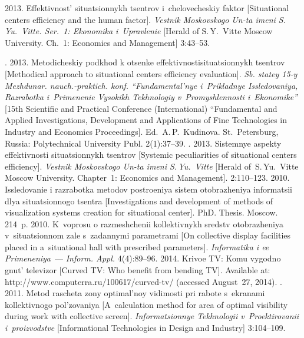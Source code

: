 \begin{multicols}{2}
{{\begin{thebibliography}{99}
 2013. Effektivnost' situatsionnykh tsentrov
i~chelovecheskiy faktor [Situational centers efficiency and the human factor]. \textit{Vestnik
Moskovskogo Un-ta imeni S.\,Yu.~Vitte. Ser.~1: Ekonomika i~Upravlenie} [Herald of
S.\,Y.~Vitte Moscow University. Ch.~1: Economics and Management]  3:43--53.

. 2013. Metodicheskiy
podkhod k otsenke effektivnosti\linebreak si\-tu\-a\-tsi\-onnykh tsentrov [Methodical approach to situational
centers efficiency evaluation]. \textit{Sb. statey 15-y Mezhdunar. nauch.-praktich. konf.
``Fundamental'nye i~Prikladnye Issledovaniya, Razrabotka i~Primenenie Vysokikh Tekhnologiy
v~Promyshlennosti i~Ekonomike''} [15th Scientific and Practical Conference
(International) ``Fundamental and Applied Investigations, Development
and Applications of Fine Technologies in Industry and Economics Proceedings].
Ed.\ A.\,P.~Kudinova. St.\ Petersburg, Russia:
Polytechnical University Publ. 2(1):37--39.
. 2013. Sistemnye aspekty effektivnosti
situatsionnykh tsentrov [Systemic peculiarities of situational centers efficiency]. \textit{Vestnik
Moskovskogo Un-ta imeni S.\,Yu.~Vitte} [Herald of~S.\,Yu.~Vitte Moscow University.
Chapter~1: Economics and Management]. 2:110--123.
 2010. Issledovanie i razrabotka metodov postroeniya sistem
otobrazheniya informatsii dlya si\-tu\-a\-tsi\-on\-no\-go tsentra [Investigations and development of
methods of visualization systems creation for situational center]. PhD. Thesis. Moscow. 214~p.
 2010. K~voprosu o razmeshchenii kollektivnykh sredstv
otobrazheniya v~situatsionnom zale s~zadannymi parametrami [On collective
display facilities placed in a~situational hall with prescribed parameters].
\textit{Informatika i ee Primeneniya}~--- \textit{Inform. Appl.} 4(4):89--96.
 2014. {Krivoe TV: Komu vygodno gnut' televizor} [Curved TV: Who
benefit from bending TV]. Available at: {\sf
http://www.computerra.ru/100617/curved-tv/} (accessed August~27, 2014).
. 2011. Metod rascheta zony
optimal'noy vidimosti pri rabote s~ekranami kollektivnogo pol'zovaniya [A~calculation method
for area of optimal visibility during work with collective screen].
\textit{Informatsionnye Tekhnologii v~Proektirovanii i~proizvodstve} [Informational
Technologies in Design and Industry] 3:104--109.


\end{thebibliography}}}
\end{multicols}
